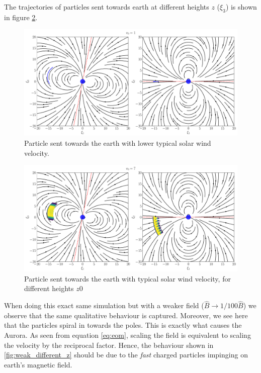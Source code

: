 The trajectories of particles sent towards earth at different heights $z$ ($\xi_3$) is shown in figure \ref{fig:different_z}.

\begin{figure}[htb]
	\centering
	\includegraphics[width=\columnwidth]{../fig/earth_traj_slow.pdf}
	\caption{Particle sent towards the earth with lower typical solar wind velocity.}
	\label{fig:slow_part}
\end{figure}
\begin{figure}[h!]
	\centering
	\includegraphics[width=\columnwidth]{../fig/traj_diffz.pdf}
	\caption{Particle sent towards the earth with typical solar wind velocity, for different heights $z0$}
	\label{fig:different_z}
\end{figure}

When doing this exact same simulation but with a weaker field ($\hat{B} \to 1/100 \hat{B}$) we observe that the same qualitative behaviour is captured. Moreover, we see here that the particles spiral in towards the poles. This is exactly what causes the Aurora. As seen from equation \eqref{eq:eom}, scaling the field is equivalent to scaling the velocity by the reciprocal factor. Hence, the behaviour shown in \ref{fig:weak_different_z} should be due to the \textit{fast} charged particles impinging on earth's magnetic field. 

